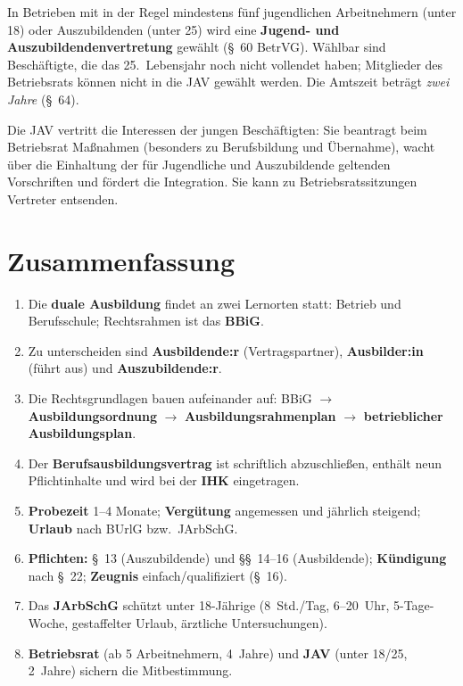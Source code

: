 \documentclass[11pt, a4paper]{article}
\begin{document}
In Betrieben mit in der Regel mindestens fünf jugendlichen Arbeitnehmern (unter 18) oder
Auszubildenden (unter 25) wird eine \textbf{Jugend- und Auszubildendenvertretung} gewählt
(\S~60 BetrVG). Wählbar sind Beschäftigte, die das 25.\ Lebensjahr noch nicht vollendet haben;
Mitglieder des Betriebsrats können nicht in die JAV gewählt werden. Die Amtszeit beträgt
\emph{zwei Jahre} (\S~64).

Die JAV vertritt die Interessen der jungen Beschäftigten: Sie beantragt beim Betriebsrat
Maßnahmen (besonders zu Berufsbildung und Übernahme), wacht über die Einhaltung der für
Jugendliche und Auszubildende geltenden Vorschriften und fördert die Integration. Sie kann zu
Betriebsratssitzungen Vertreter entsenden.

\section{Zusammenfassung}

\begin{enumerate}
  \item Die \textbf{duale Ausbildung} findet an zwei Lernorten statt: Betrieb und Berufsschule; Rechtsrahmen ist das \textbf{BBiG}.
  \item Zu unterscheiden sind \textbf{Ausbildende:r} (Vertragspartner), \textbf{Ausbilder:in} (führt aus) und \textbf{Auszubildende:r}.
  \item Die Rechtsgrundlagen bauen aufeinander auf: BBiG $\rightarrow$ \textbf{Ausbildungsordnung} $\rightarrow$ \textbf{Ausbildungsrahmenplan} $\rightarrow$ \textbf{betrieblicher Ausbildungsplan}.
  \item Der \textbf{Berufsausbildungsvertrag} ist schriftlich abzuschließen, enthält neun Pflichtinhalte und wird bei der \textbf{IHK} eingetragen.
  \item \textbf{Probezeit} 1--4 Monate; \textbf{Vergütung} angemessen und jährlich steigend; \textbf{Urlaub} nach BUrlG bzw.\ JArbSchG.
  \item \textbf{Pflichten:} \S~13 (Auszubildende) und \S\S~14--16 (Ausbildende); \textbf{Kündigung} nach \S~22; \textbf{Zeugnis} einfach/qualifiziert (\S~16).
  \item Das \textbf{JArbSchG} schützt unter 18-Jährige (8~Std./Tag, 6--20~Uhr, 5-Tage-Woche, gestaffelter Urlaub, ärztliche Untersuchungen).
  \item \textbf{Betriebsrat} (ab 5 Arbeitnehmern, 4~Jahre) und \textbf{JAV} (unter 18/25, 2~Jahre) sichern die Mitbestimmung.
\end{enumerate}
\end{document}
